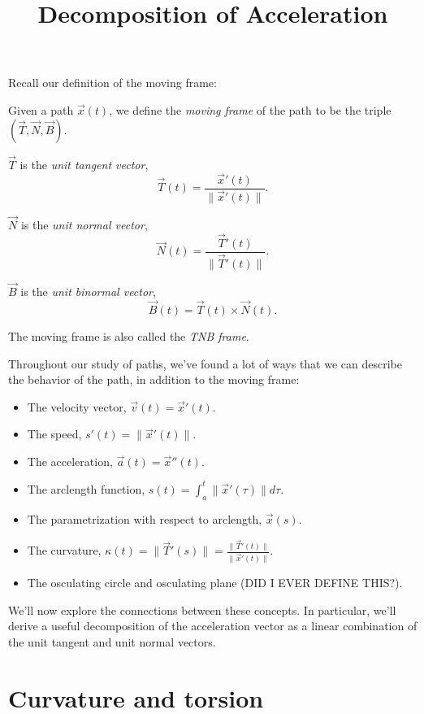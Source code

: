 \documentclass{ximera}
\title{Decomposition of Acceleration}
\begin{document}
\begin{abstract}
\end{abstract}
\maketitle

Recall our definition of the moving frame:

\begin{definition}
Given a path $\vec{x}(t)$, we define the \emph{moving frame} of the path to be the triple $(\vec{T},\vec{N},\vec{B})$.

$\vec{T}$ is the \emph{unit tangent vector},
\[
\vec{T}(t) = \dfrac{\vec{x}'(t)}{\|\vec{x}'(t)\|}.
\]

$\vec{N}$ is the \emph{unit normal vector},
\[
\vec{N}(t) = \dfrac{\vec{T}'(t)}{\|\vec{T}'(t)\|}.
\]

$\vec{B}$ is the \emph{unit binormal vector},
\[
\vec{B}(t) = \vec{T}(t)\times\vec{N}(t).
\] 

The moving frame is also called the \emph{TNB frame}.
\end{definition}

Throughout our study of paths, we've found a lot of ways that we can describe the behavior of the path, in addition to the moving frame:
\begin{itemize}
\item The velocity vector, $\vec{v}(t)= \vec{x}'(t)$.
\item The speed, $s'(t) = \|\vec{x}'(t)\|$.
\item The acceleration, $\vec{a}(t) = \vec{x}''(t)$.
\item The arclength function, $s(t) = \int_a^t \|\vec{x}'(\tau)\|d\tau$.
\item The parametrization with respect to arclength, $\vec{x}(s)$.
\item The curvature, $\kappa(t) = \|\vec{T}'(s)\| = \frac{\|\vec{T}'(t)\|}{\|\vec{x}'(t)\|}$.
\item The osculating circle and osculating plane (DID I EVER DEFINE THIS?).
\end{itemize}

We'll now explore the connections between these concepts. In particular, we'll derive a useful decomposition of the acceleration vector as a linear combination of the unit tangent and unit normal vectors.

\section*{Curvature and torsion}
\end{document}
